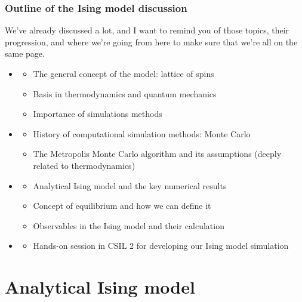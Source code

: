 \documentclass[hyperref={colorlinks=true}]{beamer}
\begin{document}
\begin{frame}%
  \frametitle{Outline of the Ising model discussion}

  We've already discussed a lot, and I want to remind you of those topics, their progression, and where we're going from here to make sure that we're all on the same page.
  
  \begin{itemize}
    \item {}
    \begin{itemize}
      \item The general concept of the model: lattice of spins
      \item Basis in thermodynamics and quantum mechanics
      \item Importance of simulations methods
    \end{itemize}
    \item {}
    \begin{itemize}
      \item History of computational simulation methods: Monte Carlo
      \item The Metropolis Monte Carlo algorithm and its assumptions (deeply related to thermodynamics)
    \end{itemize}
    \item {}
    \begin{itemize}
      \item Analytical Ising model and the key numerical results
      \item Concept of equilibrium and how we can define it
      \item Observables in the Ising model and their calculation
    \end{itemize}
    \item {}
    \begin{itemize}
      \item Hands-on session in CSIL 2 for developing our Ising model simulation
    \end{itemize}
  \end{itemize}

\end{frame}

\section[Analytical Ising model]{Analytical Ising model}
\end{document}
